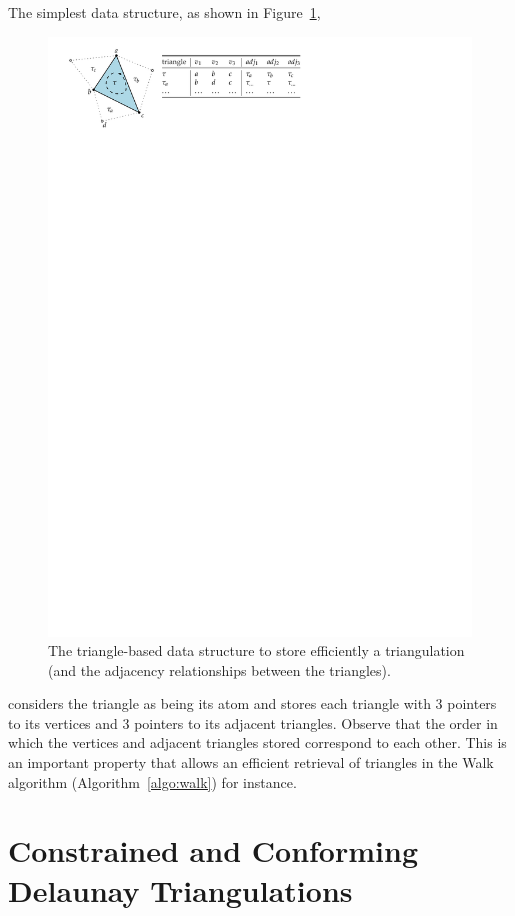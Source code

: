 The simplest data structure, as shown in Figure~\ref{fig:tr_ds}, 
\begin{figure}
  \centering
  \includegraphics[width=0.95\linewidth]{figs/tr_ds}
  \caption{The triangle-based data structure to store efficiently a triangulation (and the adjacency relationships between the triangles).}
\label{fig:tr_ds}
\end{figure}
considers the triangle as being its atom and stores each triangle with 3 pointers to its vertices and 3 pointers to its adjacent triangles. Observe that the order in which the vertices and adjacent triangles stored correspond to each other. This is an important property that allows an efficient retrieval of triangles in the Walk algorithm (Algorithm~\ref{algo:walk}) for instance.




\section{Constrained and Conforming Delaunay Triangulations}

